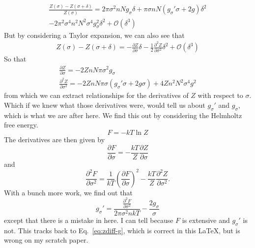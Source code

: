 \documentclass[letterpaper,twocolumn,amsmath,amssymb,pre,aps,10pt]{revtex4-1}
\begin{document}
\begin{multline}
  \frac{Z(\sigma)-Z(\sigma+\delta)}{Z(\sigma)} =
  2\pi\sigma^2 n N g_\sigma \delta +
  \pi\sigma n N  \left(g_\sigma'\sigma + 2g\right)
  \delta^2 \\
  - 2\pi^2\sigma^4n^2N^2\sigma^4g_\sigma^2\delta^2 + \mathcal{O}(\delta^3)
\end{multline}
But by considering a Taylor expansion, we can also see that
\begin{multline}
  Z(\sigma)-Z(\sigma+\delta) =
  -\frac{\partial Z}{\partial \sigma} \delta
  -\frac12 \frac{\partial^2 Z}{\partial \sigma^2} \delta^2  + \mathcal{O}(\delta^3)
\end{multline}
So that
\begin{multline}
  \frac{\partial Z}{\partial \sigma} =
  -2ZnN\pi\sigma^2g_\sigma\\
  \frac{\partial^2 Z}{\partial \sigma^2} =
  -2ZnN\pi\sigma\left(g_\sigma'\sigma + 2g\sigma \right)
  +4Zn^2N^2\sigma^4g^2
\end{multline}
from which we can extract relationships for the derivatives of $Z$
with respect to $\sigma$.  Which if we knew what those derivatives
were, would tell us about $g_\sigma'$ and $g_\sigma$, which is what we
are after here.  We find this out by considering the Helmholtz free
energy.
\begin{equation}
  F = -kT \ln Z
\end{equation}
The derivatives are then given by
\begin{equation}
  \frac{\partial F}{\partial \sigma} = -\frac{kT}{Z} \frac{\partial
    Z}{\partial \sigma}
\end{equation}
and
\begin{equation}
  \frac{\partial^2 F}{\partial \sigma^2} =
  \frac{1}{kT}\left(\frac{\partial F}{\partial \sigma}\right)^2
  -\frac{kT}{Z} \frac{\partial^2
    Z}{\partial \sigma^2}.
\end{equation}
With a bunch more work, we find out that
\begin{equation}
  g_\sigma' = \frac{\frac{\partial^2 F}{\partial
      \sigma^2}}{2\pi\sigma^2nkT}
  - \frac{2g_\sigma}{\sigma}
\end{equation}
except that there is a mistake in here.  I can tell because $F$ is
extensive and $g_\sigma'$ is not.  This tracks back to
Eq.~\ref{eq:zdiff-g}, which is correct in this \LaTeX, but is wrong on
my scratch paper.

\end{document}

